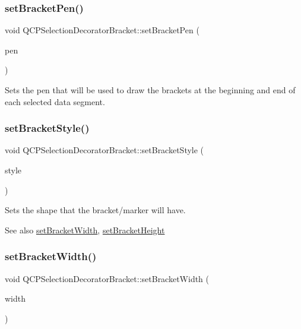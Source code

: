\subsubsection{\texorpdfstring{setBracketPen()}{setBracketPen()}}
{\footnotesize\ttfamily void Q\+C\+P\+Selection\+Decorator\+Bracket\+::set\+Bracket\+Pen (\begin{DoxyParamCaption}\item[{const Q\+Pen \&}]{pen }\end{DoxyParamCaption})}

Sets the pen that will be used to draw the brackets at the beginning and end of each selected data segment. \mbox{\label{class_q_c_p_selection_decorator_bracket_a04507697438f6ad8cc2aeea5422dcbe5}} 
\subsubsection{\texorpdfstring{setBracketStyle()}{setBracketStyle()}}
{\footnotesize\ttfamily void Q\+C\+P\+Selection\+Decorator\+Bracket\+::set\+Bracket\+Style (\begin{DoxyParamCaption}\item[{\mbox{\hyperlink{class_q_c_p_selection_decorator_bracket_aa6d18517ec0553575bbef0de4252336e}{Q\+C\+P\+Selection\+Decorator\+Bracket\+::\+Bracket\+Style}}}]{style }\end{DoxyParamCaption})}

Sets the shape that the bracket/marker will have.

\begin{DoxySeeAlso}{See also}
\mbox{\hyperlink{class_q_c_p_selection_decorator_bracket_a291b59cab98ce93a0a3c85963fe10f5e}{set\+Bracket\+Width}}, \mbox{\hyperlink{class_q_c_p_selection_decorator_bracket_aed773ad737201cca40efc6fe451acad8}{set\+Bracket\+Height}} 
\end{DoxySeeAlso}
\mbox{\label{class_q_c_p_selection_decorator_bracket_a291b59cab98ce93a0a3c85963fe10f5e}} 
\subsubsection{\texorpdfstring{setBracketWidth()}{setBracketWidth()}}
{\footnotesize\ttfamily void Q\+C\+P\+Selection\+Decorator\+Bracket\+::set\+Bracket\+Width (\begin{DoxyParamCaption}\item[{int}]{width }\end{DoxyParamCaption})}


